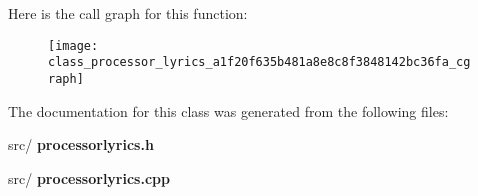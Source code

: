 Here is the call graph for this function\+:\nopagebreak
\begin{figure}[H]
\begin{center}
\leavevmode
\texttt{[image: class\_processor\_lyrics\_a1f20f635b481a8e8c8f3848142bc36fa\_cgraph]}
\end{center}
\end{figure}


The documentation for this class was generated from the following files\+:\begin{DoxyCompactItemize}
\item 
src/\textbf{ processorlyrics.\+h}\item 
src/\textbf{ processorlyrics.\+cpp}\end{DoxyCompactItemize}
